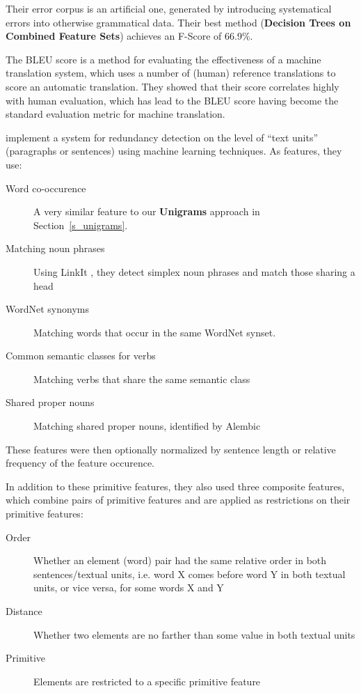 \documentclass[a4paper,10pt]{scrartcl}
\theoremstyle{style}
\begin{document}
Their error corpus is an artificial one, generated by introducing systematical errors into otherwise grammatical data. Their best method (\textbf{Decision Trees on Combined Feature Sets}) achieves an F-Score of 66.9\%.

The BLEU score \citep{papineni2002bleu} is a method for evaluating the effectiveness of a machine translation system, which uses a number of (human) reference translations to score an automatic translation. They showed that their score correlates highly with human evaluation, which has lead to the BLEU score having become the standard evaluation metric for machine translation.

\cite{hatzivassiloglou1999detecting} implement a system for redundancy detection on the level of ``text units'' (paragraphs or sentences) using machine learning techniques. As features, they use:

\begin{description}
	\item[Word co-occurence] A very similar feature to our \textbf{Unigrams} approach in Section~\ref{s_unigrams}.
	\item[Matching noun phrases] Using LinkIt \citep{wacholder1998simplex}, they detect simplex noun phrases and match those sharing a head
	\item[WordNet synonyms] Matching words that occur in the same WordNet \citep{fellbaum2005wordnet} synset.
	\item[Common semantic classes for verbs] Matching verbs that share the same semantic class \citep{levin1993english}
	\item[Shared proper nouns] Matching shared proper nouns, identified by Alembic \citep{aberdeen1995mitre}
\end{description}

These features were then optionally normalized by sentence length or relative frequency of the feature occurence.

In addition to these primitive features, they also used three composite features, which combine pairs of primitive features and are applied as restrictions on their primitive features:

\begin{description}
	\item[Order] Whether an element (word) pair had the same relative order in both sentences/textual units, i.e. word X comes before word Y in both textual units, or vice versa, for some words X and Y
	\item[Distance] Whether two elements are no farther than some value in both textual units
	\item[Primitive] Elements are restricted to a specific primitive feature
\end{description}
\end{document}
